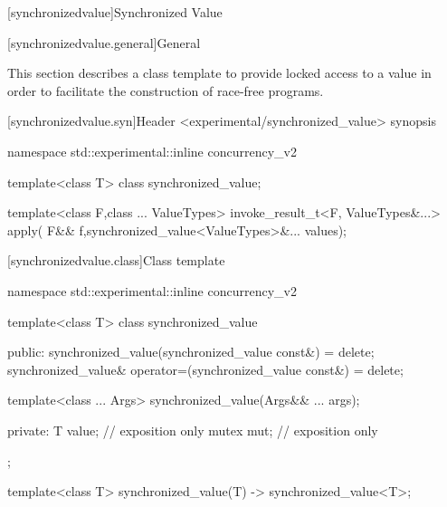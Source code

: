 
[synchronizedvalue]{Synchronized Value}

[synchronizedvalue.general]{General}

This section describes a class template to provide locked access to a
value in order to facilitate the construction of race-free programs.

[synchronizedvalue.syn]{Header <experimental/synchronized_value> synopsis}

\begin{codeblock}
namespace std::experimental::inline concurrency_v2 {
    template<class T>
    class synchronized_value;

    template<class F,class ... ValueTypes>
    invoke_result_t<F, ValueTypes&...> apply(
        F&& f,synchronized_value<ValueTypes>&... values);
}
\end{codeblock}

[synchronizedvalue.class]{Class template  }

\begin{codeblock}
namespace std::experimental::inline concurrency_v2 {
  template<class T>
    class synchronized_value
    {
    public:
        synchronized_value(synchronized_value const&) = delete;
        synchronized_value& operator=(synchronized_value const&) = delete;

        template<class ... Args>
        synchronized_value(Args&& ... args);

    private:
        T value; // exposition only
        mutex mut; // exposition only
    };

template<class T>
synchronized_value(T)
-> synchronized_value<T>;
}
\end{codeblock}

